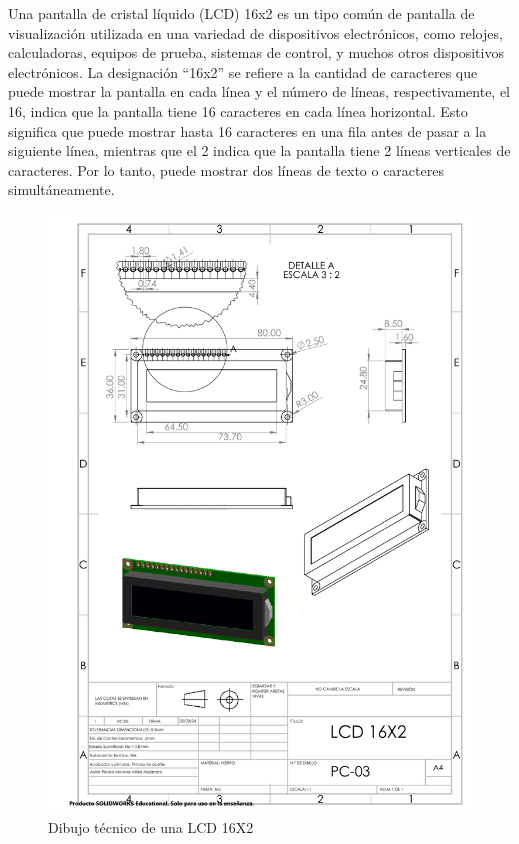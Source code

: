     Una pantalla de cristal líquido (LCD) 16x2 es un tipo común de pantalla de visualización utilizada en una variedad de dispositivos electrónicos, como relojes, calculadoras, equipos de prueba, sistemas de control, y muchos otros dispositivos electrónicos. La designación “16x2” se refiere a la cantidad de caracteres que puede mostrar la pantalla en cada línea y el número de líneas, respectivamente, el 16, indica que la pantalla tiene 16 caracteres en cada línea horizontal. Esto significa que puede mostrar hasta 16 caracteres en una fila antes de pasar a la siguiente línea, mientras que el 2 indica que la pantalla tiene 2 líneas verticales de caracteres. Por lo tanto, puede mostrar dos líneas de texto o caracteres simultáneamente.
    \begin{figure}[H]
        \centering
        \includegraphics[trim = {7mm 1mm 1mm 1mm},clip,scale=0.4]{22/Img/lcdDibujo.PDF}
        \caption{Dibujo técnico de una LCD 16X2}
        \label{fig:lcd}
    \end{figure}
    
